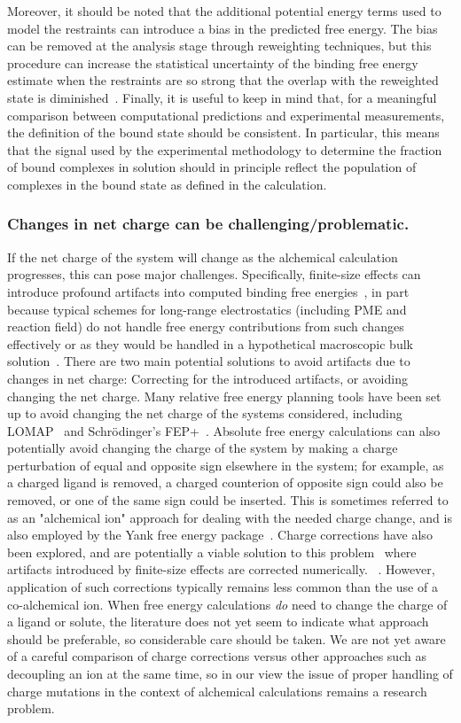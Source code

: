 \documentclass[9pt,bestpractices]{livecoms}
\begin{document}
Moreover, it should be noted that the additional potential energy terms used to model the restraints can introduce a bias in the predicted free energy.
The bias can be removed at the analysis stage through reweighting techniques, but this procedure can increase the statistical uncertainty of the binding free energy estimate when the restraints are so strong that the overlap with the reweighted state is diminished~\cite{}.
%
Finally, it is useful to keep in mind that, for a meaningful comparison between computational predictions and experimental measurements, the definition of the bound state should be consistent.
In particular, this means that the signal used by the experimental methodology to determine the fraction of bound complexes in solution should in principle reflect the population of complexes in the bound state as defined in the calculation.
%
\subsubsection{Changes in net charge can be challenging/problematic.}
If the net charge of the system will change as the alchemical calculation progresses, this can pose major challenges.
Specifically, finite-size effects can introduce profound artifacts into computed binding free energies~\cite{}, in part because typical schemes for long-range electrostatics (including PME and reaction field) do not handle free energy contributions from such changes effectively or as they would be handled in a hypothetical macroscopic bulk solution~\cite{}.
%
There are two main potential solutions to avoid artifacts due to changes in net charge: Correcting for the introduced artifacts, or avoiding changing the net charge.
%
Many relative free energy planning tools have been set up to avoid changing the net charge of the systems considered, including LOMAP~\cite{} and Schr\"{o}dinger's FEP+~\cite{chen2018accurate}. Absolute free energy calculations can also potentially avoid changing the charge of the system by making a charge perturbation of equal and opposite sign elsewhere in the system; for example, as a charged ligand is removed, a charged counterion of opposite sign could also be removed, or one of the same sign could be inserted. This is sometimes referred to as an "alchemical ion" approach for dealing with the needed charge change, and is also employed by the Yank free energy package~\cite{wang2013identifying}.
Charge corrections have also been explored, and are potentially a viable solution to this problem~\cite{} where artifacts introduced by finite-size effects are corrected numerically.
~\cite{chen2018accurate}. However, application of such corrections typically remains less common than the use of a co-alchemical ion.
%
When free energy calculations \emph{do} need to change the charge of a ligand or solute, the literature does not yet seem to indicate what approach should be preferable, so considerable care should be taken.
We are not yet aware of a careful comparison of charge corrections versus other approaches such as decoupling an ion at the same time, so in our view the issue of proper handling of charge mutations in the context of alchemical calculations remains a research problem.
%
\end{document}
